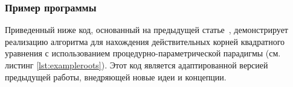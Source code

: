 
\subsubsection{Пример программы}

Приведенный ниже код, основанный на предыдущей статье~\cite{легалов2000процедурно}, демонстрирует реализацию алгоритма для нахождения действительных корней квадратного уравнения с использованием процедурно-параметрической парадигмы (см. листинг \ref{lst:exampleroots}).
Этот код является адаптированной версией предыдущей работы, внедряющей новые идеи и концепции.

